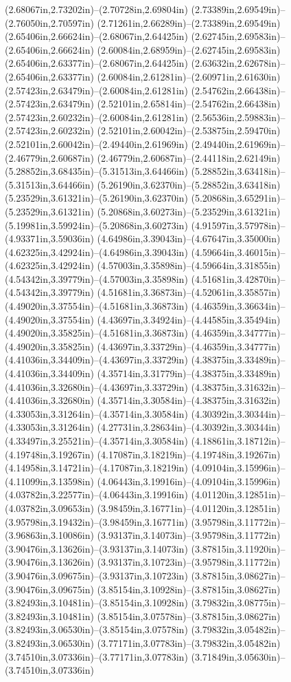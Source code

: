 (2.68067in,2.73202in)--(2.70728in,2.69804in) (2.73389in,2.69549in)--(2.76050in,2.70597in) (2.71261in,2.66289in)--(2.73389in,2.69549in) (2.65406in,2.66624in)--(2.68067in,2.64425in) (2.62745in,2.69583in)--(2.65406in,2.66624in) (2.60084in,2.68959in)--(2.62745in,2.69583in) (2.65406in,2.63377in)--(2.68067in,2.64425in) (2.63632in,2.62678in)--(2.65406in,2.63377in) (2.60084in,2.61281in)--(2.60971in,2.61630in) (2.57423in,2.63479in)--(2.60084in,2.61281in) (2.54762in,2.66438in)--(2.57423in,2.63479in) (2.52101in,2.65814in)--(2.54762in,2.66438in) (2.57423in,2.60232in)--(2.60084in,2.61281in) (2.56536in,2.59883in)--(2.57423in,2.60232in) (2.52101in,2.60042in)--(2.53875in,2.59470in) (2.52101in,2.60042in)--(2.49440in,2.61969in) (2.49440in,2.61969in)--(2.46779in,2.60687in) (2.46779in,2.60687in)--(2.44118in,2.62149in) (5.28852in,3.68435in)--(5.31513in,3.64466in) (5.28852in,3.63418in)--(5.31513in,3.64466in) (5.26190in,3.62370in)--(5.28852in,3.63418in) (5.23529in,3.61321in)--(5.26190in,3.62370in) (5.20868in,3.65291in)--(5.23529in,3.61321in) (5.20868in,3.60273in)--(5.23529in,3.61321in) (5.19981in,3.59924in)--(5.20868in,3.60273in) (4.91597in,3.57978in)--(4.93371in,3.59036in) (4.64986in,3.39043in)--(4.67647in,3.35000in) (4.62325in,3.42924in)--(4.64986in,3.39043in) (4.59664in,3.46015in)--(4.62325in,3.42924in) (4.57003in,3.35898in)--(4.59664in,3.31855in) (4.54342in,3.39779in)--(4.57003in,3.35898in) (4.51681in,3.42870in)--(4.54342in,3.39779in) (4.51681in,3.36873in)--(4.52061in,3.35857in) (4.49020in,3.37554in)--(4.51681in,3.36873in) (4.46359in,3.36634in)--(4.49020in,3.37554in) (4.43697in,3.34924in)--(4.44585in,3.35494in) (4.49020in,3.35825in)--(4.51681in,3.36873in) (4.46359in,3.34777in)--(4.49020in,3.35825in) (4.43697in,3.33729in)--(4.46359in,3.34777in) (4.41036in,3.34409in)--(4.43697in,3.33729in) (4.38375in,3.33489in)--(4.41036in,3.34409in) (4.35714in,3.31779in)--(4.38375in,3.33489in) (4.41036in,3.32680in)--(4.43697in,3.33729in) (4.38375in,3.31632in)--(4.41036in,3.32680in) (4.35714in,3.30584in)--(4.38375in,3.31632in) (4.33053in,3.31264in)--(4.35714in,3.30584in) (4.30392in,3.30344in)--(4.33053in,3.31264in) (4.27731in,3.28634in)--(4.30392in,3.30344in) (4.33497in,3.25521in)--(4.35714in,3.30584in) (4.18861in,3.18712in)--(4.19748in,3.19267in) (4.17087in,3.18219in)--(4.19748in,3.19267in) (4.14958in,3.14721in)--(4.17087in,3.18219in) (4.09104in,3.15996in)--(4.11099in,3.13598in) (4.06443in,3.19916in)--(4.09104in,3.15996in) (4.03782in,3.22577in)--(4.06443in,3.19916in) (4.01120in,3.12851in)--(4.03782in,3.09653in) (3.98459in,3.16771in)--(4.01120in,3.12851in) (3.95798in,3.19432in)--(3.98459in,3.16771in) (3.95798in,3.11772in)--(3.96863in,3.10086in) (3.93137in,3.14073in)--(3.95798in,3.11772in) (3.90476in,3.13626in)--(3.93137in,3.14073in) (3.87815in,3.11920in)--(3.90476in,3.13626in) (3.93137in,3.10723in)--(3.95798in,3.11772in) (3.90476in,3.09675in)--(3.93137in,3.10723in) (3.87815in,3.08627in)--(3.90476in,3.09675in) (3.85154in,3.10928in)--(3.87815in,3.08627in) (3.82493in,3.10481in)--(3.85154in,3.10928in) (3.79832in,3.08775in)--(3.82493in,3.10481in) (3.85154in,3.07578in)--(3.87815in,3.08627in) (3.82493in,3.06530in)--(3.85154in,3.07578in) (3.79832in,3.05482in)--(3.82493in,3.06530in) (3.77171in,3.07783in)--(3.79832in,3.05482in) (3.74510in,3.07336in)--(3.77171in,3.07783in) (3.71849in,3.05630in)--(3.74510in,3.07336in) 